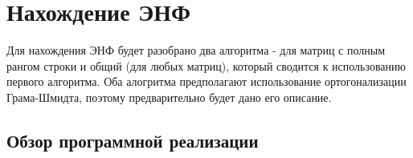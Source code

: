 \newpage

\section{Нахождение ЭНФ}

Для нахождения ЭНФ будет разобрано два алгоритма - для матриц с полным рангом строки и общий (для любых матриц), который сводится к использованию первого алгоритма. Оба алогритма предполагают использование ортогонализации Грама-Шмидта, поэтому предварительно будет дано его описание.


\subsection{Обзор программной реализации}


\clearpage